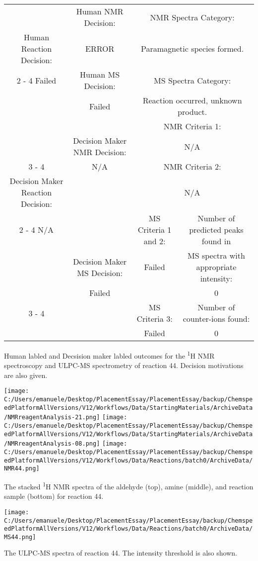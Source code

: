 \documentclass{article}%
\begin{document}
\begin{Decision Table}[H]%
\begin{tabular}{|c|c|c|c|}%
\hline%
&Human NMR Decision:&\multicolumn{2}{|c|}{NMR Spectra Category:}\\%
Human Reaction Decision:&ERROR&\multicolumn{2}{|c|}{Paramagnetic species formed.}\\%
\cline{2%
-%
4}%
Failed&Human MS Decision:&\multicolumn{2}{|c|}{MS Spectra Category:}\\%
&Failed&\multicolumn{2}{|c|}{Reaction occurred, unknown product.}\\%
\hline%
&&\multicolumn{2}{|c|}{NMR Criteria 1:}\\%
&Decision Maker NMR Decision:&\multicolumn{2}{|c|}{N/A}\\%
\cline{3%
-%
4}%
&N/A&\multicolumn{2}{|c|}{NMR Criteria 2:}\\%
Decision Maker Reaction Decision:&&\multicolumn{2}{|c|}{N/A}\\%
\cline{2%
-%
4}%
N/A&&MS Criteria 1 and 2:&Number of predicted peaks found in\\%
&Decision Maker MS Decision:&Failed&MS spectra with appropriate intensity:\\%
&Failed&&0\\%
\cline{3%
-%
4}%
&&MS Criteria 3:&Number of counter{-}ions found:\\%
&&Failed&0\\%
\hline%
\end{tabular}%
\caption{Human labled and Decsision maker labled outcomes for the \textsuperscript{1}H NMR spectroscopy and ULPC-MS spectrometry of reaction 44. Decision motivations are also given.}%
\end{Decision Table}%
\begin{NMR Spectra}[H]%
\begin{center}%
\texttt{[image: C:/Users/emanuele/Desktop/PlacementEssay/PlacementEssay/backup/ChemspeedPlatformAllVersions/V12/Workflows/Data/StartingMaterials/ArchiveData/NMRreagentAnalysis-21.png]}\hfill%
\texttt{[image: C:/Users/emanuele/Desktop/PlacementEssay/PlacementEssay/backup/ChemspeedPlatformAllVersions/V12/Workflows/Data/StartingMaterials/ArchiveData/NMRreagentAnalysis-08.png]}\hfill%
\texttt{[image: C:/Users/emanuele/Desktop/PlacementEssay/PlacementEssay/backup/ChemspeedPlatformAllVersions/V12/Workflows/Data/Reactions/batch0/ArchiveData/NMR44.png]}\hfill%
\end{center}%
\caption{The stacked \textsuperscript{1}H NMR spectra of the aldehyde (top), amine (middle), and reaction sample (bottom) for reaction 44.}%
\end{NMR Spectra}%
\begin{MS Spectra}[H]%
\begin{center}%
\texttt{[image: C:/Users/emanuele/Desktop/PlacementEssay/PlacementEssay/backup/ChemspeedPlatformAllVersions/V12/Workflows/Data/Reactions/batch0/ArchiveData/MS44.png]}\hfill%
\end{center}%
\caption{The ULPC-MS spectra of reaction 44. The intensity threshold is also shown.}%
\end{MS Spectra}%
\end{document}
